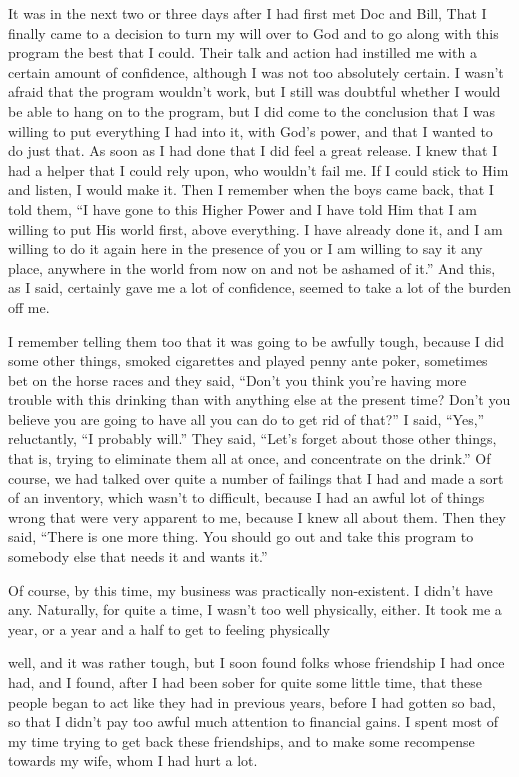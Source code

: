 \begin{biblechapter}
       It was in the next two or three days after I had first met Doc and Bill, That I finally came to a decision to turn my will over to God and to go along with this program the best that I could. Their talk and action had instilled me with a certain amount of confidence, although I was not too absolutely certain. I wasn’t afraid that the program wouldn’t work, but I still was doubtful whether I would be able to hang on to the program, but I did come to the conclusion that I was willing to put everything I had into it, with God’s power, and that I wanted to do just that. As soon as I had done that I did feel a great release. I knew that
I had a helper that I could rely upon, who wouldn’t fail me. If I could stick to Him and listen, I would make it. Then I remember when the boys came back, that I told them, “I have gone to this Higher Power and I have told Him that I am willing to put His world first, above everything. I have already done it, and I am willing to do it again here in the presence of you or I am willing to say it any place, anywhere in the world from now on and not be ashamed of it.” And this, as I said, certainly gave me a lot of confidence, seemed to take a lot of the burden off me.

I remember telling them too that it was going to be awfully tough, because I did some other things, smoked cigarettes and played penny ante poker, sometimes bet on the horse races and they said, “Don’t you think you’re having more trouble with this drinking than with anything else at the present time? Don’t you believe you are going to have all you can do to get rid of that?” I said, “Yes,” reluctantly, “I probably will.” They said, “Let’s forget about those other things, that is, trying to eliminate them all at once, and concentrate on the drink.” Of course, we had talked over quite a number of failings that I had and made a sort of an inventory, which wasn’t to difficult, because I had an awful lot of things wrong that were very apparent to me, because I knew all about them. Then they said, “There is one more thing. You should go out and take this program to somebody else that needs it and wants it.”

Of course, by this time, my business was practically non-existent. I didn’t have any. Naturally, for quite a time, I wasn’t too well physically, either. It took me a year, or a year and a half to get to feeling physically

well, and it was rather tough, but I soon found folks whose friendship I had once had, and I found, after I had been sober for quite some little time, that these people began to act like they had in previous years, before I had gotten so bad, so that I didn’t pay too awful much attention to financial gains. I spent most of my time trying to get back these friendships, and to make some recompense towards my wife, whom I had hurt a lot.


\end{biblechapter}
